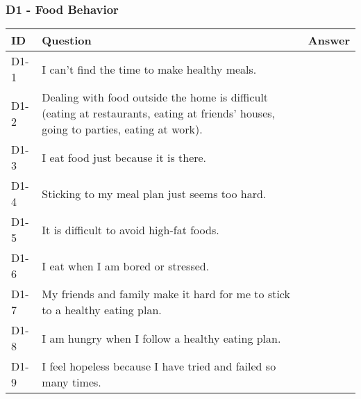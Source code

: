 \subsubsection{D1 - Food Behavior}
\begin{table}[H]
    \centering
    \renewcommand{\arraystretch}{1.2}
    \begin{tabularx}{\textwidth}{|l|X|l|}
        \hline
        \textbf{ID} & \textbf{Question} & \textbf{Answer} \\ \hline
        D1-1 & I can't find the time to make healthy meals. &  \\ \hline
        D1-2 & Dealing with food outside the home is difficult (eating at restaurants, eating at friends' houses, going to parties, eating at work). &  \\ \hline
        D1-3 & I eat food just because it is there. &  \\ \hline
        D1-4 & Sticking to my meal plan just seems too hard. &  \\ \hline
        D1-5 & It is difficult to avoid high-fat foods. &  \\ \hline
        D1-6 & I eat when I am bored or stressed. &  \\ \hline
        D1-7 & My friends and family make it hard for me to stick to a healthy eating plan. &  \\ \hline
        D1-8 & I am hungry when I follow a healthy eating plan. &  \\ \hline
        D1-9 & I feel hopeless because I have tried and failed so many times. &  \\ \hline
    \end{tabularx}
\end{table}

